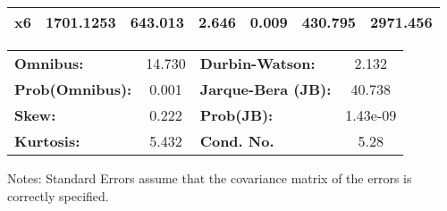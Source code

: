 \begin{center}
\begin{tabular}{lcccccc}
\textbf{x6}    &    1701.1253  &      643.013     &     2.646  &         0.009        &      430.795    &     2971.456     \\
\bottomrule
\end{tabular}
\begin{tabular}{lclc}
\textbf{Omnibus:}       & 14.730 & \textbf{  Durbin-Watson:     } &    2.132  \\
\textbf{Prob(Omnibus):} &  0.001 & \textbf{  Jarque-Bera (JB):  } &   40.738  \\
\textbf{Skew:}          &  0.222 & \textbf{  Prob(JB):          } & 1.43e-09  \\
\textbf{Kurtosis:}      &  5.432 & \textbf{  Cond. No.          } &     5.28  \\
\bottomrule
\end{tabular}
\end{center}

Notes: \newline
 [1] Standard Errors assume that the covariance matrix of the errors is correctly specified.